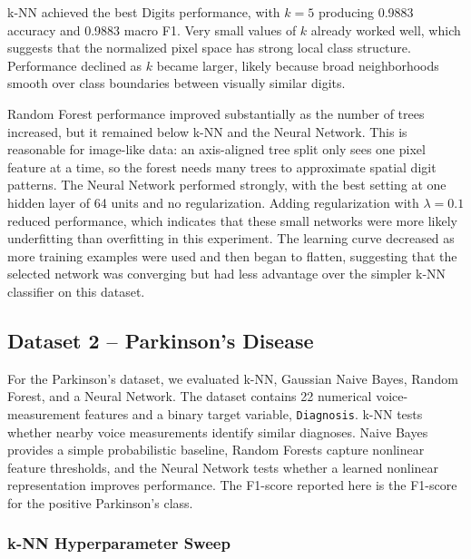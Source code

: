 \documentclass[11pt]{article}
\begin{document}
k-NN achieved the best Digits performance, with $k=5$ producing 0.9883 accuracy and
0.9883 macro F1. Very small values of $k$ already worked well, which suggests that the
normalized pixel space has strong local class structure. Performance declined as $k$
became larger, likely because broad neighborhoods smooth over class boundaries between
visually similar digits.

Random Forest performance improved substantially as the number of trees increased, but it
remained below k-NN and the Neural Network. This is reasonable for image-like data: an
axis-aligned tree split only sees one pixel feature at a time, so the forest needs many
trees to approximate spatial digit patterns. The Neural Network performed strongly, with
the best setting at one hidden layer of 64 units and no regularization. Adding
regularization with $\lambda=0.1$ reduced performance, which indicates that these small
networks were more likely underfitting than overfitting in this experiment. The learning
curve decreased as more training examples were used and then began to flatten, suggesting
that the selected network was converging but had less advantage over the simpler k-NN
classifier on this dataset.

\subsection{Dataset 2 -- Parkinson's Disease}

For the Parkinson's dataset, we evaluated k-NN, Gaussian Naive Bayes, Random Forest, and a
Neural Network. The dataset contains 22 numerical voice-measurement features and a binary
target variable, \texttt{Diagnosis}. k-NN tests whether nearby voice measurements identify
similar diagnoses. Naive Bayes provides a simple probabilistic baseline, Random Forests
capture nonlinear feature thresholds, and the Neural Network tests whether a learned
nonlinear representation improves performance. The F1-score reported here is the F1-score
for the positive Parkinson's class.

\subsubsection*{k-NN Hyperparameter Sweep}
\end{document}
